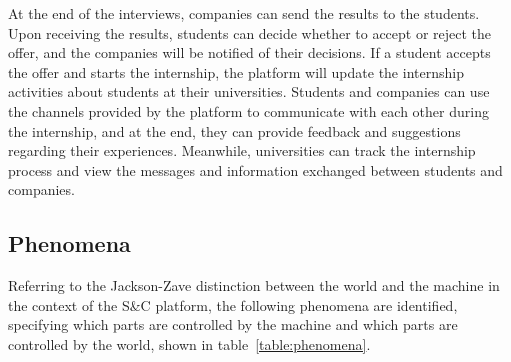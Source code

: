At the end of the interviews, companies can send the results to the students. Upon receiving the results, students can decide whether to accept 
or reject the offer, and the companies will be notified of their decisions. If a student accepts the offer and starts the internship, the platform 
will update the internship activities about students at their universities. Students and companies can use the channels provided by the platform to
communicate with each other during the internship, and at the end, they can provide feedback and suggestions regarding their experiences. Meanwhile,
universities can track the internship process and view the messages and information exchanged between students and companies.

\subsection{Phenomena}
Referring to the Jackson-Zave distinction between the world and the machine in the context of the S\&C platform, the following phenomena are 
identified, specifying which parts are controlled by the machine and which parts are controlled by the world, shown in table~\ref{table:phenomena}.

